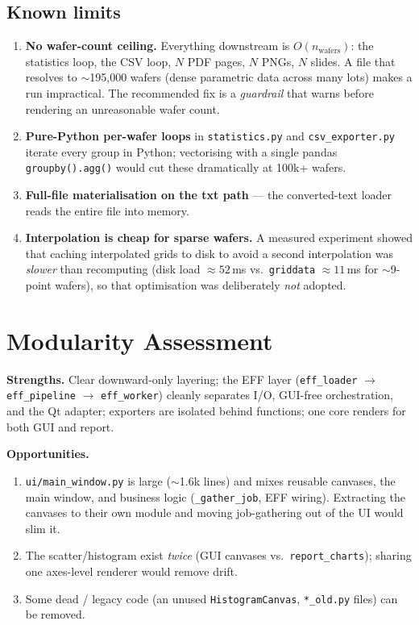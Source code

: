 \documentclass[11pt,a4paper]{report}
\newcommand{\code}[1]{\texttt{#1}}
\begin{document}
\section{Known limits}
\begin{enumerate}[leftmargin=1.6em]
  \item \textbf{No wafer-count ceiling.} Everything downstream is
        $O(n_\text{wafers})$: the statistics loop, the CSV loop, $N$ PDF pages,
        $N$ PNGs, $N$ slides. A file that resolves to $\sim$195{,}000 wafers
        (dense parametric data across many lots) makes a run impractical. The
        recommended fix is a \emph{guardrail} that warns before rendering an
        unreasonable wafer count.
  \item \textbf{Pure-Python per-wafer loops} in \code{statistics.py} and
        \code{csv\_exporter.py} iterate every group in Python; vectorising with a
        single pandas \code{groupby().agg()} would cut these dramatically at 100k+
        wafers.
  \item \textbf{Full-file materialisation on the txt path} — the converted-text
        loader reads the entire file into memory.
  \item \textbf{Interpolation is cheap for sparse wafers.} A measured experiment
        showed that caching interpolated grids to disk to avoid a second
        interpolation was \emph{slower} than recomputing (disk load
        $\approx52$\,ms vs.\ \code{griddata} $\approx11$\,ms for $\sim$9-point
        wafers), so that optimisation was deliberately \emph{not} adopted.
\end{enumerate}

\chapter{Modularity Assessment}\label{ch:modularity}

\textbf{Strengths.} Clear downward-only layering; the EFF layer
(\code{eff\_loader} $\to$ \code{eff\_pipeline} $\to$ \code{eff\_worker}) cleanly
separates I/O, GUI-free orchestration, and the Qt adapter; exporters are isolated
behind functions; one core renders for both GUI and report.

\textbf{Opportunities.}
\begin{enumerate}[leftmargin=1.6em]
  \item \code{ui/main\_window.py} is large ($\sim$1.6k lines) and mixes reusable
        canvases, the main window, and business logic
        (\code{\_gather\_job}, EFF wiring). Extracting the canvases to their own
        module and moving job-gathering out of the UI would slim it.
  \item The scatter/histogram exist \emph{twice} (GUI canvases vs.\
        \code{report\_charts}); sharing one axes-level renderer would remove drift.
  \item Some dead / legacy code (an unused \code{HistogramCanvas},
        \code{*\_old.py} files) can be removed.
\end{enumerate}
\end{document}
